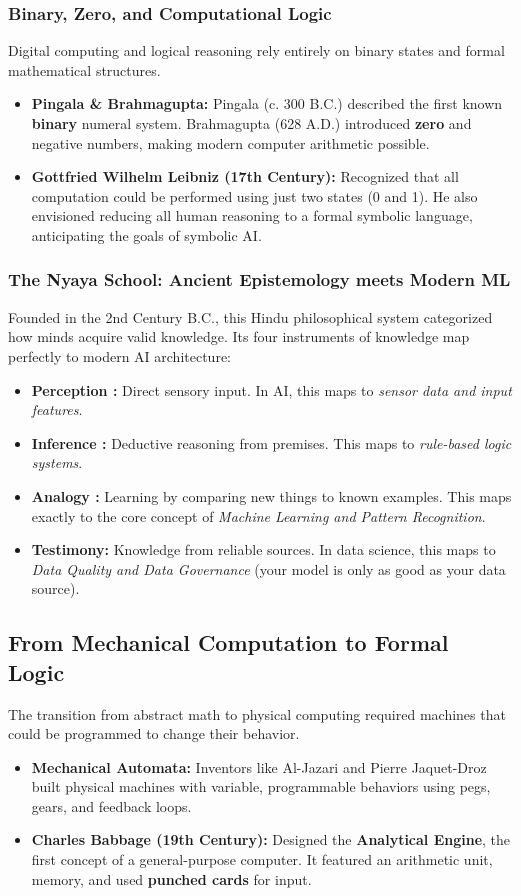 \documentclass[11pt]{article}
\theoremstyle{smallexample}
\begin{document}
\subsubsection{Binary, Zero, and Computational Logic}
Digital computing and logical reasoning rely entirely on binary states and formal mathematical structures.
\begin{itemize}
    \item \textbf{Pingala \& Brahmagupta:} Pingala (c. 300 B.C.) described the first known \textbf{binary} numeral system. Brahmagupta (628 A.D.) introduced \textbf{zero} and negative numbers, making modern computer arithmetic possible.
    \item \textbf{Gottfried Wilhelm Leibniz (17th Century):} Recognized that all computation could be performed using just two states (0 and 1). He also envisioned reducing all human reasoning to a formal symbolic language, anticipating the goals of symbolic AI.
\end{itemize}

\subsubsection{The Nyaya School: Ancient Epistemology meets Modern ML}
Founded in the 2nd Century B.C., this Hindu philosophical system categorized how minds acquire valid knowledge. Its four instruments of knowledge map perfectly to modern AI architecture:
\begin{itemize}
    \item \textbf{Perception :} Direct sensory input. In AI, this maps to \textit{sensor data and input features}.
    \item \textbf{Inference :} Deductive reasoning from premises. This maps to \textit{rule-based logic systems}.
    \item \textbf{Analogy :} Learning by comparing new things to known examples. This maps exactly to the core concept of \textit{Machine Learning and Pattern Recognition}.
    \item \textbf{Testimony:} Knowledge from reliable sources. In data science, this maps to \textit{Data Quality and Data Governance} (your model is only as good as your data source).
\end{itemize}

\subsection{From Mechanical Computation to Formal Logic}
The transition from abstract math to physical computing required machines that could be programmed to change their behavior.
\begin{itemize}
    \item \textbf{Mechanical Automata:} Inventors like Al-Jazari and Pierre Jaquet-Droz built physical machines with variable, programmable behaviors using pegs, gears, and feedback loops.
    \item \textbf{Charles Babbage (19th Century):} Designed the \textbf{Analytical Engine}, the first concept of a general-purpose computer. It featured an arithmetic unit, memory, and used \textbf{punched cards} for input.
\end{itemize}
\end{document}
